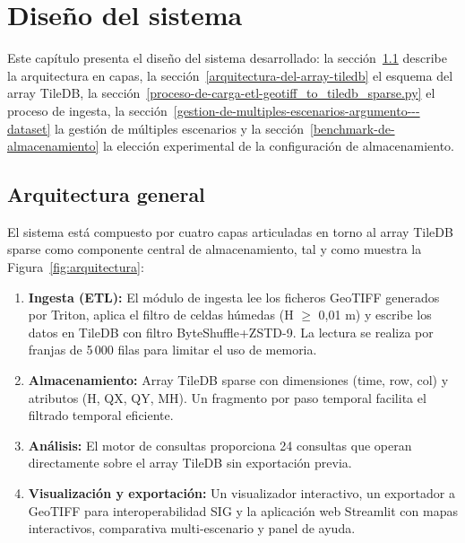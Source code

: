 \chapter{Diseño del sistema}\label{diseno-del-sistema}

Este capítulo presenta el diseño del sistema desarrollado: la sección~\ref{arquitectura-general} describe la arquitectura en capas, la sección~\ref{arquitectura-del-array-tiledb} el esquema del array TileDB, la sección~\ref{proceso-de-carga-etl-geotiff_to_tiledb_sparse.py} el proceso de ingesta, la sección~\ref{gestion-de-multiples-escenarios-argumento---dataset} la gestión de múltiples escenarios y la sección~\ref{benchmark-de-almacenamiento} la elección experimental de la configuración de almacenamiento.

\section{Arquitectura general}\label{arquitectura-general}

El sistema está compuesto por cuatro capas articuladas en torno al array TileDB sparse como componente central de almacenamiento, tal y como muestra la Figura~\ref{fig:arquitectura}:

\begin{enumerate}
\item \textbf{Ingesta (ETL):} El módulo de ingesta lee los ficheros GeoTIFF generados por Triton, aplica el filtro de celdas húmedas (H $\geq$ 0,01 m) y escribe los datos en TileDB con filtro ByteShuffle+ZSTD-9. La lectura se realiza por franjas de 5\,000 filas para limitar el uso de memoria.
\item \textbf{Almacenamiento:} Array TileDB sparse con dimensiones (time, row, col) y atributos (H, QX, QY, MH). Un fragmento por paso temporal facilita el filtrado temporal eficiente.
\item \textbf{Análisis:} El motor de consultas proporciona 24 consultas que operan directamente sobre el array TileDB sin exportación previa.
\item \textbf{Visualización y exportación:} Un visualizador interactivo, un exportador a GeoTIFF para interoperabilidad SIG y la aplicación web Streamlit con mapas interactivos, comparativa multi-escenario y panel de ayuda.
\end{enumerate}

